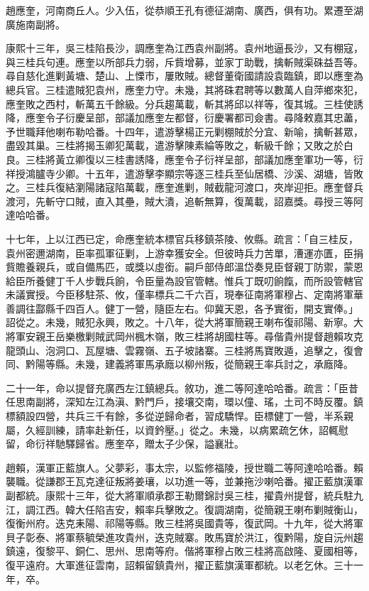 \begin{pinyinscope}
趙應奎，河南商丘人。少入伍，從恭順王孔有德征湖南、廣西，俱有功。累遷至湖廣施南副將。

康熙十三年，吳三桂陷長沙，調應奎為江西袁州副將。袁州地逼長沙，又有棚寇，與三桂兵句連。應奎以所部兵力弱，斥貲增募，並家丁助戰，擒斬賊渠硃益吾等。尋自慈化進剿黃塘、楚山、上慄市，屢敗賊。總督董衛國請設袁臨鎮，即以應奎為總兵官。三桂遣賊犯袁州，應奎力守。未幾，其將硃君聘等以數萬人自萍鄉來犯，應奎敗之西村，斬萬五千餘級。分兵趨萬載，斬其將邱以祥等，復其城。三桂使誘降，應奎令子衍慶呈部，部議加應奎左都督，衍慶署都司僉書。尋降敕嘉其忠藎，予世職拜他喇布勒哈番。十四年，遣游擊楊正元剿棚賊於分宜、新喻，擒斬甚眾，盡毀其巢。三桂將揭玉卿犯萬載，遣游擊陳素綸等敗之，斬級千餘；又敗之於白良。三桂將黃立卿復以三桂書誘降，應奎令子衍祥呈部，部議加應奎軍功一等，衍祥授鴻臚寺少卿。十五年，遣游擊李顯宗等逐三桂兵至仙居橋、沙溪、湖塘，皆敗之。三桂兵復結瀏陽諸寇陷萬載，應奎進剿，賊截龍河渡口，夾岸迎拒。應奎督兵渡河，先斬守口賊，直入其壘，賊大潰，追斬無算，復萬載，詔嘉獎。尋授三等阿達哈哈番。

十七年，上以江西已定，命應奎統本標官兵移鎮茶陵、攸縣。疏言：「自三桂反，袁州密邇湖南，臣率孤軍征剿，上游幸獲安全。但彼時兵力苦單，漕運亦匱，臣捐貲贍養親兵，或自備馬匹，或獎以虛銜。嗣戶部侍郎溫岱奏見臣督親丁防禦，蒙恩給臣所養健丁千人步戰兵餉，令臣量為設官管轄。惟兵丁既叨餉餼，而所設管轄官未議實授。今臣移駐茶、攸，僅率標兵二千六百，現奉征南將軍穆占、定南將軍華善調往酃縣千四百人。健丁一營，隨臣左右。仰冀天恩，各予實銜，開支實俸。」詔從之。未幾，賊犯永興，敗之。十八年，從大將軍簡親王喇布復祁陽、新寧。大將軍安親王岳樂檄剿賊武岡州楓木嶺，敗三桂將胡國柱等。尋偕貴州提督趙賴攻克龍頭山、泡洞口、瓦屋塘、雲霧嶺、五子坡諸寨。三桂將馬寶敗遁，追擊之，復會同、黔陽等縣。未幾，建義將軍馬承廕以柳州叛，從簡親王率兵討之，承廕降。

二十一年，命以提督充廣西左江鎮總兵。敘功，進二等阿達哈哈番。疏言：「臣昔任思南副將，深知左江為滇、黔門戶，接壤交南，環以僮、瑤，土司不時反覆。鎮標額設四營，共兵三千有餘，多從逆歸命者，習成驕悍。臣標健丁一營，半系親屬，久經訓練，請率赴新任，以資鈐壓。」從之。未幾，以病累疏乞休，詔輒慰留，命衍祥馳驛歸省。應奎卒，贈太子少保，謚襄壯。

趙賴，漢軍正藍旗人。父夢彩，事太宗，以監修福陵，授世職二等阿達哈哈番。賴襲職。從謙郡王瓦克達征叛將姜瓖，以功進一等，並兼拖沙喇哈番。擢正藍旗漢軍副都統。康熙十三年，從大將軍順承郡王勒爾錦討吳三桂，擢貴州提督，統兵駐九江，調江西。韓大任陷吉安，賴率兵擊敗之。復調湖南，從簡親王喇布剿賊衡山，復衡州府。迭克耒陽、祁陽等縣。敗三桂將吳國貴等，復武岡。十九年，從大將軍貝子彰泰、將軍蔡毓榮進攻貴州，迭克賊寨。敗馬寶於洪江，復黔陽，旋自沅州趨鎮遠，復黎平、銅仁、思州、思南等府。偕將軍穆占敗三桂將高啟隆、夏國相等，復平遠府。大軍進征雲南，詔賴留鎮貴州，擢正藍旗漢軍都統。以老乞休。三十一年，卒。


\end{pinyinscope}

